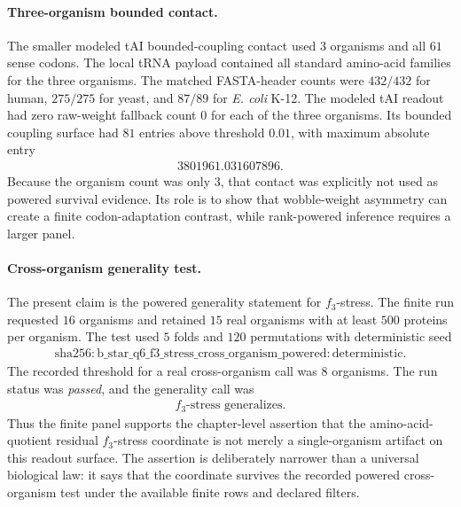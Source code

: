 \paragraph{Three-organism bounded contact.}
The smaller modeled tAI bounded-coupling contact used $3$ organisms and all $61$ sense codons.  The local tRNA payload contained all standard amino-acid families for the three organisms.  The matched FASTA-header counts were $432/432$ for human, $275/275$ for yeast, and $87/89$ for \emph{E. coli} K-12.  The modeled tAI readout had zero raw-weight fallback count $0$ for each of the three organisms.  Its bounded coupling surface had $81$ entries above threshold $0.01$, with maximum absolute entry
$$
\begin{aligned}
3801961.031607896.
\end{aligned}
$$
Because the organism count was only $3$, that contact was explicitly not used as powered survival evidence.  Its role is to show that wobble-weight asymmetry can create a finite codon-adaptation contrast, while rank-powered inference requires a larger panel.

\paragraph{Cross-organism generality test.}
The present claim is the powered generality statement for $f_3$-stress.  The finite run requested $16$ organisms and retained $15$ real organisms with at least $500$ proteins per organism.  The test used $5$ folds and $120$ permutations with deterministic seed
$$
\begin{aligned}
\mathrm{sha256{:}b\_star\_q6\_f3\_stress\_cross\_organism\_powered{:}deterministic}.
\end{aligned}
$$
The recorded threshold for a real cross-organism call was $8$ organisms.  The run status was \emph{passed}, and the generality call was
$$
\begin{aligned}
f_3\text{-stress generalizes}.
\end{aligned}
$$
Thus the finite panel supports the chapter-level assertion that the amino-acid-quotient residual $f_3$-stress coordinate is not merely a single-organism artifact on this readout surface.  The assertion is deliberately narrower than a universal biological law: it says that the coordinate survives the recorded powered cross-organism test under the available finite rows and declared filters.

